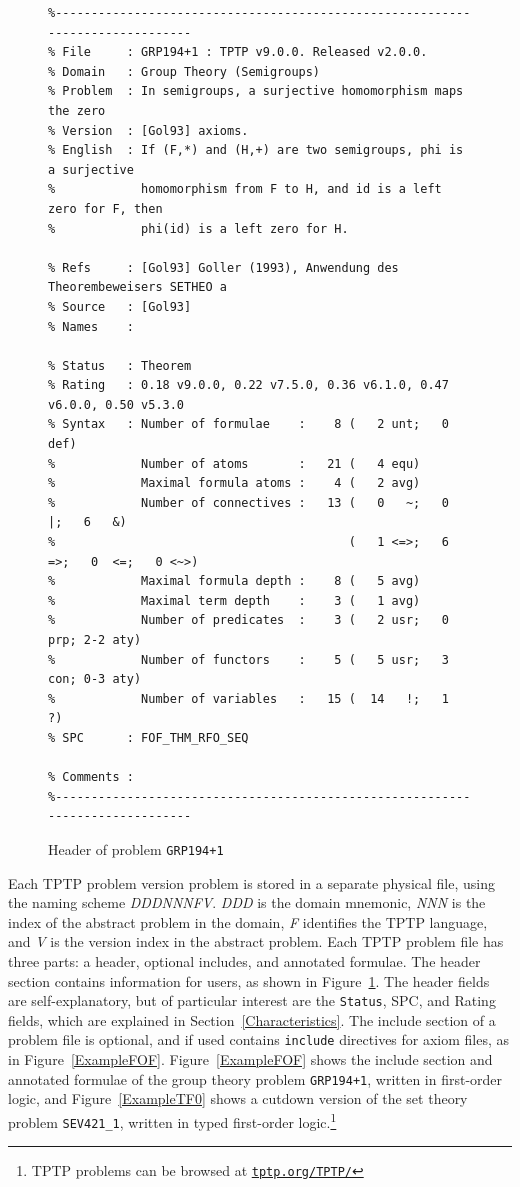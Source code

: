 \documentclass[runningheads]{llncs}
\begin{document}
\begin{figure}[htb]
\centering
{\scriptsize
{\setlength{\baselineskip}{2.5mm}
\begin{verbatim}
%------------------------------------------------------------------------------
% File     : GRP194+1 : TPTP v9.0.0. Released v2.0.0.
% Domain   : Group Theory (Semigroups)
% Problem  : In semigroups, a surjective homomorphism maps the zero
% Version  : [Gol93] axioms.
% English  : If (F,*) and (H,+) are two semigroups, phi is a surjective
%            homomorphism from F to H, and id is a left zero for F, then 
%            phi(id) is a left zero for H.

% Refs     : [Gol93] Goller (1993), Anwendung des Theorembeweisers SETHEO a
% Source   : [Gol93]
% Names    :

% Status   : Theorem
% Rating   : 0.18 v9.0.0, 0.22 v7.5.0, 0.36 v6.1.0, 0.47 v6.0.0, 0.50 v5.3.0
% Syntax   : Number of formulae    :    8 (   2 unt;   0 def)
%            Number of atoms       :   21 (   4 equ)
%            Maximal formula atoms :    4 (   2 avg)
%            Number of connectives :   13 (   0   ~;   0   |;   6   &)
%                                         (   1 <=>;   6  =>;   0  <=;   0 <~>)
%            Maximal formula depth :    8 (   5 avg)
%            Maximal term depth    :    3 (   1 avg)
%            Number of predicates  :    3 (   2 usr;   0 prp; 2-2 aty)
%            Number of functors    :    5 (   5 usr;   3 con; 0-3 aty)
%            Number of variables   :   15 (  14   !;   1   ?)
% SPC      : FOF_THM_RFO_SEQ

% Comments :
%------------------------------------------------------------------------------
\end{verbatim}
}}
\caption{Header of problem {\tt GRP194+1}}
\label{ExampleHeader}
\end{figure}

Each TPTP problem version problem is stored in a separate physical file, using the naming scheme 
{\em DDDNNNFV}.
{\em DDD} is the domain mnemonic, {\em NNN} is the index of the abstract problem in the domain,
{\em F} identifies the TPTP language, and {\em V} is the version index in the abstract problem.
Each TPTP problem file has three parts: a header, optional includes, and annotated formulae.
The header section contains information for users, as shown in Figure~\ref{ExampleHeader}.
The header fields are self-explanatory, but of particular interest are the {\tt Status}, SPC,
and Rating fields, which are explained in Section~\ref{Characteristics}.
The include section of a problem file is optional, and if used contains {\tt include} directives 
for axiom files, as in Figure~\ref{ExampleFOF}.
Figure~\ref{ExampleFOF} shows the include section and annotated formulae of the group theory 
problem {\tt GRP194+1}, written in first-order logic, and Figure~\ref{ExampleTF0} shows a cutdown 
version of the set theory problem {\tt SEV421\_1}, written in typed first-order logic.\footnote{%
TPTP problems can be browsed at \href{https://tptp.org/TPTP/}{{\tt tptp.org/TPTP/}}}
\end{document}
